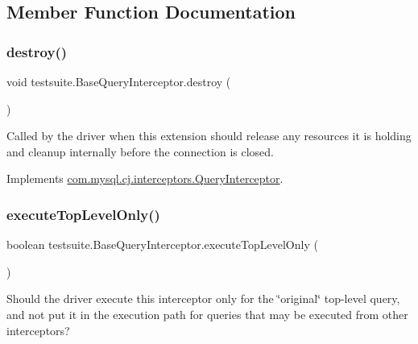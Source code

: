 \subsection{Member Function Documentation}
\mbox{\label{classtestsuite_1_1_base_query_interceptor_a8f368e0057821e78db66d4282c4d3b8e}} 
\subsubsection{\texorpdfstring{destroy()}{destroy()}}
{\footnotesize\ttfamily void testsuite.\+Base\+Query\+Interceptor.\+destroy (\begin{DoxyParamCaption}{ }\end{DoxyParamCaption})}

Called by the driver when this extension should release any resources it is holding and cleanup internally before the connection is closed. 

Implements \mbox{\hyperlink{interfacecom_1_1mysql_1_1cj_1_1interceptors_1_1_query_interceptor_a123809a91800f4f4409f5f37717bf9c8}{com.\+mysql.\+cj.\+interceptors.\+Query\+Interceptor}}.

\mbox{\label{classtestsuite_1_1_base_query_interceptor_ad806e1659dde0537e052f1825ee6a40e}} 
\subsubsection{\texorpdfstring{execute\+Top\+Level\+Only()}{executeTopLevelOnly()}}
{\footnotesize\ttfamily boolean testsuite.\+Base\+Query\+Interceptor.\+execute\+Top\+Level\+Only (\begin{DoxyParamCaption}{ }\end{DoxyParamCaption})}

Should the driver execute this interceptor only for the \char`\"{}original\char`\"{} top-\/level query, and not put it in the execution path for queries that may be executed from other interceptors?

